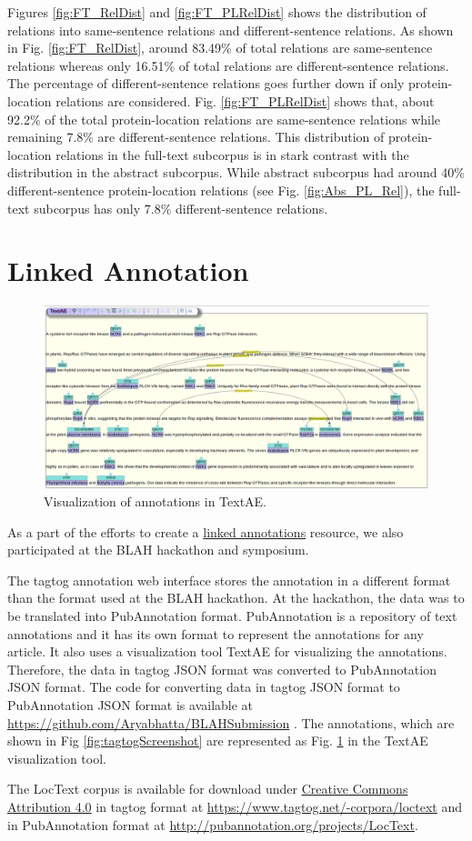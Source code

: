 Figures \ref{fig:FT_RelDist} and \ref{fig:FT_PLRelDist} shows the distribution of relations into same-sentence relations and different-sentence relations. As shown in Fig. \ref{fig:FT_RelDist}, around 83.49\% of total relations are same-sentence relations whereas only 16.51\% of total relations are different-sentence relations. The percentage of different-sentence relations goes further down if only protein-location relations are considered. Fig. \ref{fig:FT_PLRelDist} shows that, about 92.2\% of the total protein-location relations are same-sentence relations while remaining 7.8\% are different-sentence relations. This distribution of protein-location relations in the full-text subcorpus is in stark contrast with the distribution in the abstract subcorpus. While abstract subcorpus had around 40\% different-sentence protein-location relations (see Fig. \ref{fig:Abs_PL_Rel}), the full-text subcorpus has only 7.8\% different-sentence relations.

\section{Linked Annotation}


\begin{figure}
\centering
\includegraphics[scale=0.25]{figures/TextAE_Vis.png}
\caption{Visualization of annotations in TextAE.}\label{fig:TextAEVis}
\end{figure}

As a part of the efforts to create a \hyperref[http://2015.linkedannotation.org/background]{linked annotations} resource, we also participated at the BLAH \cite{blah} hackathon and symposium.

The tagtog annotation web interface stores the annotation in a different format than the format used at the BLAH hackathon. At the hackathon, the data was to be translated into PubAnnotation format. PubAnnotation \cite{kim2012pubannotation} is a repository of text annotations and it has its own format to represent the annotations for any article. It also uses a visualization tool TextAE \cite{textae} for visualizing the annotations. Therefore, the data in tagtog JSON format was converted to PubAnnotation JSON format. The code for converting data in tagtog JSON format to PubAnnotation JSON format is available at \url{https://github.com/Aryabhatta/BLAHSubmission} \cite{blahsubmission}. The annotations, which are shown in Fig \ref{fig:tagtogScreenshot} are represented as Fig. \ref{fig:TextAEVis} in the TextAE visualization tool. 

The LocText corpus is available for download under \hyperref[https://creativecommons.org/licenses/by/4.0/]{Creative Commons Attribution 4.0} in tagtog format at \url{https://www.tagtog.net/-corpora/loctext} and in PubAnnotation format at \url{http://pubannotation.org/projects/LocText}.